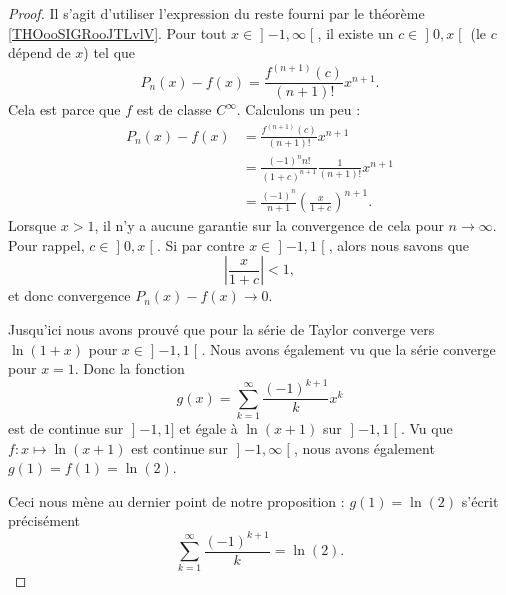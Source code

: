 \begin{proof}
Il s'agit d'utiliser l'expression du reste fourni par le théorème \ref{THOooSIGRooJTLvlV}. Pour tout \( x\in \mathopen] -1 , \infty \mathclose[\), il existe un \( c\in\mathopen] 0 , x \mathclose[\) (le \( c\) dépend de \( x\)) tel que
    \begin{equation}
        P_n(x)-f(x)=\frac{ f^{(n+1)}(c) }{ (n+1)! }x^{n+1}.
    \end{equation}
    Cela est parce que \( f\) est de classe \(  C^{\infty}\). Calculons un peu : 
    \begin{subequations}
        \begin{align}
            P_n(x)-f(x)&=\frac{ f^{(n+1)}(c) }{ (n+1)! }x^{n+1}\\
            &=\frac{ (-1)^nn! }{ (1+c)^{n+1} }\frac{1}{ (n+1)! }x^{n+1}\\
            &=\frac{ (-1)^n }{ n+1 }\left( \frac{ x }{ 1+c } \right)^{n+1}.
        \end{align}
    \end{subequations}
Lorsque \( x>1\), il n'y a aucune garantie sur la convergence de cela pour \( n\to \infty\). Pour rappel, \( c\in\mathopen] 0 , x \mathclose[\). Si par contre \( x\in\mathopen] -1 , 1 \mathclose[\), alors nous savons que
    \begin{equation}
        \left| \frac{ x }{ 1+c } \right| <1,
    \end{equation}
    et donc convergence \( P_n(x)-f(x)\to 0\).

    Jusqu'ici nous avons prouvé que pour la série de Taylor converge vers \( \ln(1+x)\) pour \( x\in \mathopen] -1 , 1 \mathclose[\). Nous avons également vu que la série converge pour \( x=1\). Donc la fonction 
        \begin{equation}
            g(x)=\sum_{k=1}^{\infty}\frac{ (-1)^{k+1} }{ k }x^k
        \end{equation}
    est de continue sur \( \mathopen] -1 , 1 \mathclose]\) et égale à \( \ln(x+1)\) sur \( \mathopen] -1 , 1 \mathclose[\). Vu que \( f\colon x\mapsto \ln(x+1)\) est continue sur \( \mathopen] -1 , \infty \mathclose[\), nous avons également \( g(1)=f(1)=\ln(2)\).

    Ceci nous mène au dernier point de notre proposition : \( g(1)=\ln(2)\) s'écrit précisément
    \begin{equation}
        \sum_{k=1}^{\infty}\frac{ (-1)^{k+1} }{ k }=\ln(2).
    \end{equation}
\end{proof}

